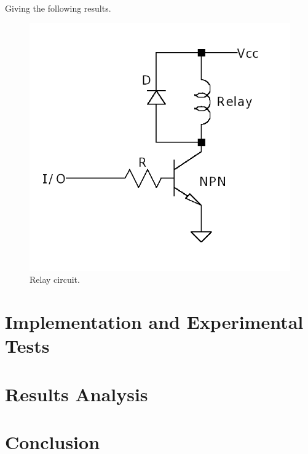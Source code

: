 \documentclass[12pt]{article}
\begin{document}
    Giving the following results.
    
    \begin{figure}[H] 
        \centering
        \includegraphics*[scale = 0.4]{images/RelayDrive.png}
        \caption{Relay circuit.}
        \label{wrap-fig:1}
    \end{figure}

\section{Implementation and Experimental Tests}

\section{Results Analysis}

\section{Conclusion}
\end{document}
